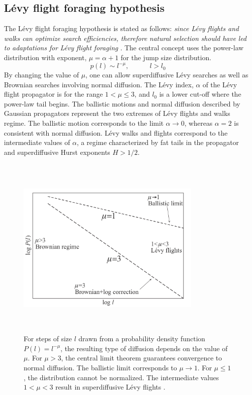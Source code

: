 \documentclass[12pt]{report}
\begin{document}
\begin{justify}
\section{L\'evy flight foraging hypothesis}
The L\'evy flight foraging hypothesis is stated as follows:
 \textit{since L\'evy flights and walks can optimize search efficiencies, therefore natural selection should have led to adaptations for L\'evy flight foraging} \cite{LFFH}.
The central concept uses the power-law distribution with exponent,   $\mu = \alpha + 1$ for the jump size distribution.
\begin{equation}
p(l) \sim l^{-\mu}, \quad \quad \quad l > l_0
\end{equation}
By changing the value of $\mu$, one can allow superdiffusive L\'evy searches as well as Brownian searches involving normal diffusion. The L\'evy index, $\alpha$ of the L\'evy flight propagator is for the range $1 < \mu \leq 3$, and $l_0$ is a lower cut-off where the power-law tail begins. The ballistic motions and normal diffusion described by Gaussian propagators represent the two extremes of L\'evy flights and walks regime. The ballistic motion corresponds to the limit $\alpha \to 0$, whereas $\alpha = 2$ is consistent with normal diffusion. L\'evy walks and flights correspond to the intermediate values of $\alpha$, a regime characterized by fat tails in the propagator and superdiffusive Hurst exponents $H > 1/2$.\\

\begin{figure}[H]
\centering
\includegraphics[height= 9cm, width = 9cm, keepaspectratio]{mu.png}
\caption{For steps of size $l$ drawn from a probability density function $P(l) = l^{-\mu}$, the resulting type of diffusion depends on the value of $\mu$. For $\mu > 3$, the central limit theorem guarantees convergence to normal diffusion. The ballistic limit corresponds to $\mu \to 1$. For $\mu \leq 1$, the distribution cannot be normalized. The intermediate values $1 < \mu < 3$ result in superdiffusive L\'evy flights \cite{physofforaging}.}
\label{fig:mu}
\end{figure}



\end{justify}
\end{document}
